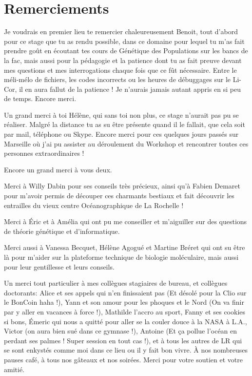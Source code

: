 \documentclass[a4paper,12pt,twoside]{article}\usepackage[]{graphicx}\usepackage[]{color}
\begin{document}
\part*{Remerciements}

Je voudrais en premier lieu te remercier chaleureusement Benoit, tout d'abord pour ce stage que tu as rendu possible, dans ce domaine pour lequel tu m'as fait prendre goût en écoutant tes cours de Génétique des Populations sur les bancs de la fac, mais aussi pour la pédagogie et la patience dont tu as fait preuve devant mes questions et mes interrogations chaque fois que ce fût nécessaire. Entre le méli-mélo de fichiers, les codes incorrects ou les heures de débuggages sur le Li-Cor, il en aura fallut de la patience ! Je n'aurais jamais autant appris en si peu de temps. Encore merci.
 
Un grand merci à toi Hélène, qui sans toi non plus, ce stage n'aurait pas pu se réaliser. Malgré la distance tu as su être présente quand il le fallait, que cela soit par mail, téléphone ou Skype. Encore merci pour ces quelques jours passés sur Marseille où j'ai pu assister au déroulement du Workshop et rencontrer toutes ces personnes extraordinaires !

Encore un grand merci à vous deux.

Merci à Willy Dabin pour ses conseils très précieux, ainsi qu'à Fabien Demaret pour m'avoir permis de découper ces charmants bestiaux et fait découvrir les entrailles du vieux centre Océanographique de La Rochelle !

Merci à Éric et à Amélia qui ont pu me conseiller et m'aiguiller sur des questions de théorie génétique et d'informatique.

Merci aussi à Vanessa Becquet, Hélène Agogué et Martine Bréret qui ont su être là pour m'aider sur la plateforme technique de biologie moléculaire, mais aussi pour leur gentillesse et leurs conseils.

Un merci tout particulier à mes collègues stagiaires de bureau, et collègues doctorants: Alice et ses appels qui n'en finissaient pas (Et désolé pour la Clio sur le BonCoin haha !), Yann et son amour pour les phoques et le Nord (On va finir par y aller en vacances à force !), Mathilde l'accro au sport, Fanny et ses cookies si bons, Émeric qui nous a quitté pour aller se la couler douce à la NASA à L.A., Victor (on aura bien sué dans ce gymnase !), Antoine (Et ça pollue l'océan en perdant ses palmes ! Super session en tout cas !), et à tous les autres de LR qui se sont enkystés comme moi dans ce lieu ou il y fait bon vivre. À nos nombreuses pauses café, à tous nos gâteaux et nos soirées. Merci pour votre soutien et votre amitié.
\end{document}
